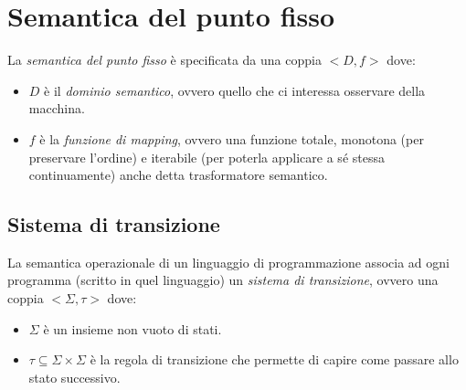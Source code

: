\documentclass[a4paper,oneside,titlepage]{book}
\begin{document}
\section{Semantica del punto fisso}
La \textit{semantica del punto fisso} è specificata da una coppia $<D,f>$ dove:
\begin{itemize}
    \item $D$ è il \textit{dominio semantico}, ovvero quello che ci interessa osservare della macchina.
    \item $f$ è la \textit{funzione di mapping}, ovvero una funzione totale, monotona (per preservare l'ordine) e iterabile (per poterla applicare a sé stessa continuamente) anche detta trasformatore semantico.
\end{itemize}

\subsection{Sistema di transizione}
La semantica operazionale di un linguaggio di programmazione associa ad ogni programma (scritto in quel linguaggio) un \textit{sistema di transizione}, ovvero una coppia $<\Sigma,\tau>$ dove:
\begin{itemize}
    \item $\Sigma$ è un insieme non vuoto di stati.
    \item $\tau \subseteq \Sigma \times \Sigma$ è la regola di transizione che permette di capire come passare allo stato successivo.
\end{itemize}
\end{document}
